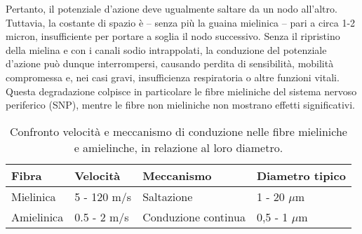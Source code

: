 Pertanto, il potenziale d'azione deve ugualmente saltare da un nodo all'altro. Tuttavia, la costante di spazio è -- senza più la guaina mielinica -- pari a circa 1-2 micron, insufficiente per portare a soglia il nodo successivo. Senza il ripristino della mielina e con i canali sodio intrappolati, la conduzione del potenziale d'azione può dunque interrompersi, causando perdita di sensibilità, mobilità compromessa e, nei casi gravi, insufficienza respiratoria o altre funzioni vitali. Questa degradazione colpisce in particolare le fibre mieliniche del sistema nervoso periferico (SNP), mentre le fibre non mieliniche non mostrano effetti significativi.


\begin{table}[h]
    \centering
    \begin{tabular}{| l | l | l | l |}
        \hline
        Fibra	& Velocità & Meccanismo	& Diametro tipico\\
        \hline
        Mielinica & 5 - 120 m/s & Saltazione & 1 - 20 $\mu$m \\
        \hline
        Amielinica & 0.5 - 2 m/s &	Conduzione continua	& 0,5 - 1 $\mu$m\\
        \hline
    \end{tabular}
    \caption{Confronto velocità e meccanismo di conduzione nelle fibre mieliniche e amielinche, in relazione al loro diametro.}
    \label{tab:vel_miel}
\end{table}

